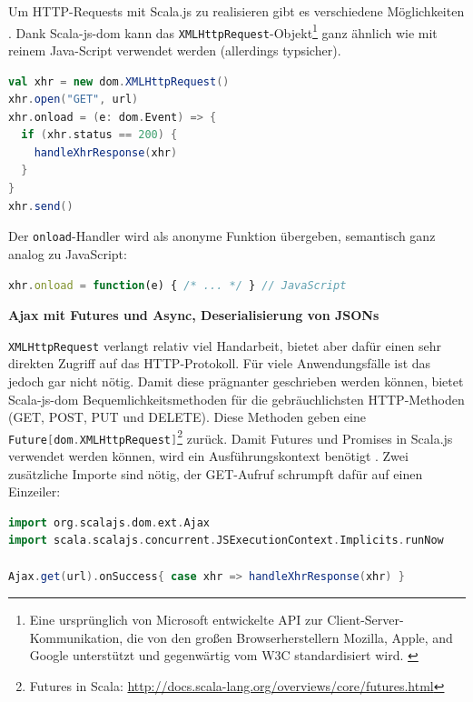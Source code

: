 \documentclass[a4paper, 12pt, hidelinks, listof=totoc, listoftables=totoc, bibliography=totoc]{scrreprt}
\newcommand{\code}[1]{\lstinline[language=Scala, style=inline]|#1|}
\newcommand{\scala}[1]{\lstinline[language=Scala, style=inline]|#1|}
\newcommand{\MyMiniSec}[1]{\rmfamily\fontsize{12}{15}\selectfont
	\vspace{7pt}\textbf{#1} %
}
\begin{document}
\pagebreak

Um \ac{HTTP}-Requests mit Scala.js zu realisieren gibt es verschiedene Möglichkeiten \cite[\#UsingWebServices]{haoyi.HOS}. Dank Scala-js-dom kann das \code{XMLHttpRequest}-Objekt\footnote{Eine ursprünglich von Microsoft entwickelte \ac{API} zur Client-Server-Kommunikation, die von den großen Browserherstellern Mozilla, Apple, and Google unterstützt und gegenwärtig vom \ac{W3C} standardisiert wird. \cite{mdn.XHR}} ganz ähnlich wie mit reinem Java-Script verwendet werden (allerdings typsicher).

\begin{lstlisting}[language=Scala, caption={HTTP-Aufruf mit XMLHttpRequest.}]
val xhr = new dom.XMLHttpRequest()
xhr.open("GET", url)
xhr.onload = (e: dom.Event) => {
  if (xhr.status == 200) {
    handleXhrResponse(xhr)
  }
}
xhr.send()
\end{lstlisting}

Der \scala{onload}-Handler wird als anonyme Funktion übergeben, semantisch ganz analog zu JavaScript:

\begin{lstlisting}[language=JavaScript, style=snippet]
xhr.onload = function(e) { /* ... */ } // JavaScript
\end{lstlisting}


\MyMiniSec{Ajax mit Futures und Async, Deserialisierung von JSONs}

\code{XMLHttpRequest} verlangt relativ viel Handarbeit, bietet aber dafür einen sehr direkten Zugriff auf das \ac{HTTP}-Protokoll. Für viele Anwendungsfälle ist das jedoch gar nicht nötig. Damit diese prägnanter geschrieben werden können, bietet Scala-js-dom Bequemlichkeitsmethoden für die gebräuchlichsten \ac{HTTP}-Methoden (GET, POST, PUT und DELETE). Diese Methoden geben eine \scala{Future[dom.XMLHttpRequest]}\footnote{Futures in Scala: \url{http://docs.scala-lang.org/overviews/core/futures.html}} zurück. Damit Futures und Promises in Scala.js verwendet werden können, wird ein Ausführungskontext benötigt \cite[\#Extensions]{scala-js-dom.DOC}. Zwei zusätzliche Importe sind nötig, der GET-Aufruf schrumpft dafür auf einen Einzeiler:

\begin{lstlisting}[language=Scala, caption={Futures-basierter HTTP-Aufruf mit Scala.js-Bequemlichkeitsmethode.}]
import org.scalajs.dom.ext.Ajax
import scala.scalajs.concurrent.JSExecutionContext.Implicits.runNow

Ajax.get(url).onSuccess{ case xhr => handleXhrResponse(xhr) }
\end{lstlisting}
\end{document}
